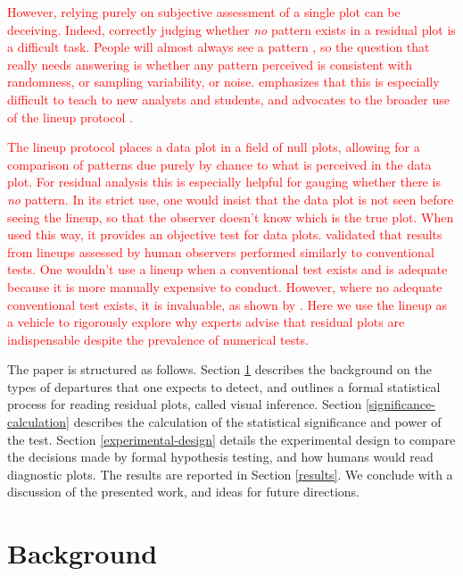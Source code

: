 \documentclass[]{interact}
\theoremstyle{plain}%
\theoremstyle{definition}
\theoremstyle{remark}
\begin{document}
\textcolor{red}{However, relying purely on subjective assessment of a single plot can be deceiving. Indeed, correctly judging whether \emph{no} pattern exists in a residual plot is a difficult task. People will almost always see a pattern \citep[see ][]{kahneman2011thinking}, so the question that really needs answering is whether any pattern perceived is consistent with randomness, or sampling variability, or noise. \cite{loy2021bringing} emphasizes that this is especially difficult to teach to new analysts and students, and advocates to the broader use of the lineup protocol \citep{bujastatistical2009}.}

\textcolor{red}{The lineup protocol places a data plot in a field of null plots, allowing for a comparison of patterns due purely by chance to what is perceived in the data plot. For residual analysis this is especially helpful for gauging whether there is \emph{no} pattern. In its strict use, one would insist that the data plot is not seen before seeing the lineup, so that the observer doesn't know which is the true plot. When used this way, it provides an objective test for data plots. \cite{majumdervalidation2013} validated that results from lineups assessed by human observers performed similarly to conventional tests. One wouldn't use a lineup when a conventional test exists and is adequate because it is more manually expensive to conduct. However, where no adequate conventional test exists, it is invaluable, as shown by \cite{loy2013diagnostic}. Here we use the lineup as a vehicle to rigorously explore why experts advise that residual plots are indispensable despite the prevalence of numerical tests.}

The paper is structured as follows. Section \ref{background} describes
the background on the types of departures that one expects to detect,
and outlines a formal statistical process for reading residual plots,
called visual inference. Section \ref{significance-calculation}
describes the calculation of the statistical significance and power of
the test. Section \ref{experimental-design} details the experimental
design to compare the decisions made by formal hypothesis testing, and
how humans would read diagnostic plots. The results are reported in
Section \ref{results}. We conclude with a discussion of the presented
work, and ideas for future directions.

\hypertarget{background}{%
\section{Background}\label{background}}
\end{document}
